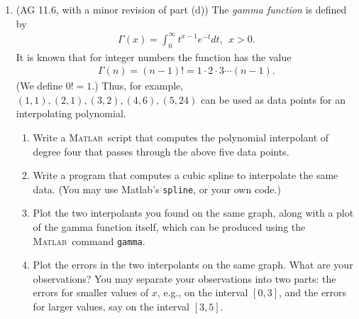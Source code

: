 \documentclass[11pt]{article}
\newcommand{\matlab}{\textsc{Matlab\ }}
\begin{document}
\begin{enumerate}
\item (AG 11.6, with a minor revision of part (d))
The {\em gamma function} is defined by
\begin{eqnarray*}
\Gamma(x)= \int_0^{\infty} t^{x-1} e^{-t} dt, \ \ x>0.
\end{eqnarray*}
It is known that  for integer numbers the function has the value
\begin{eqnarray*}
\Gamma(n)=(n-1)! = 1 \cdot 2 \cdot 3 \cdots (n-1).
\end{eqnarray*}
(We define $0!=1$.)
Thus, for example,  $(1,1),(2,1),(3,2),(4,6),(5,24)$
can be used as data points for an interpolating polynomial.
\begin{enumerate}
\item Write a \matlab script that  computes  the
polynomial interpolant of degree four
that passes through the above five data points.
\item Write a program that computes a cubic spline to interpolate
the same data. (You may use {\sc Matlab}'s {\tt spline}, or your own code.)
\item Plot the two interpolants you found on the same graph, along with
a plot of the gamma function itself, which can be produced using the
\matlab command {\tt gamma}.
\item Plot the errors in the two interpolants on the same graph. 
What are your observations? You may separate your observations into two parts: the errors for smaller values of $x$, e.g., on the interval $[0,3]$, and the errors for larger values, say on the interval $[3,5]$.
\end{enumerate}


\end{enumerate}
\end{document}
